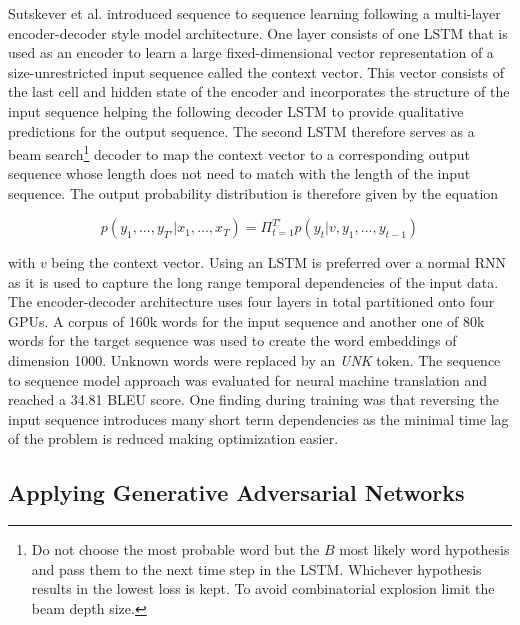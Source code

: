 Sutskever et al. \cite{Sutskever2014} introduced sequence to sequence learning following a multi-layer encoder-decoder style model architecture. One layer consists of one \ac{LSTM} that is used as an encoder to learn a large fixed-dimensional vector representation of a size-unrestricted input sequence called the context vector. This vector consists of the last cell and hidden state of the encoder and incorporates the structure of the input sequence helping the following decoder \ac{LSTM} to provide qualitative predictions for the output sequence. The second \ac{LSTM} therefore serves as a beam search\footnote{Do not choose the most probable word but the $B$ most likely word hypothesis and pass them to the next time step in the \ac{LSTM}. Whichever hypothesis results in the lowest loss is kept. To avoid combinatorial explosion limit the beam depth size.} decoder to map the context vector to a corresponding output sequence whose length does not need to match with the length of the input sequence. The output probability distribution is therefore given by the equation

\begin{equation}
	p(y_1, ..., y_{T'} | x_1, ..., x_{T}) = \Pi_{t=1}^{T'} p(y_t | v, y_1, ..., y_{t-1})
\end{equation}

with $v$ being the context vector. Using an \ac{LSTM} is preferred over a normal \ac{RNN} as it is used to capture the long range temporal dependencies of the input data. The encoder-decoder architecture uses four layers in total partitioned onto four \acp{GPU}. A corpus of 160k words for the input sequence and another one of 80k words for the target sequence was used to create the word embeddings of dimension 1000. Unknown words were replaced by an \textit{UNK} token. The sequence to sequence model approach was evaluated for neural machine translation and reached a 34.81 BLEU score. One finding during training was that reversing the input sequence introduces many short term dependencies as the minimal time lag of the problem is reduced making optimization easier. \cite{Sutskever2014}

\subsection{Applying Generative Adversarial Networks} \label{fundamentalsF}

